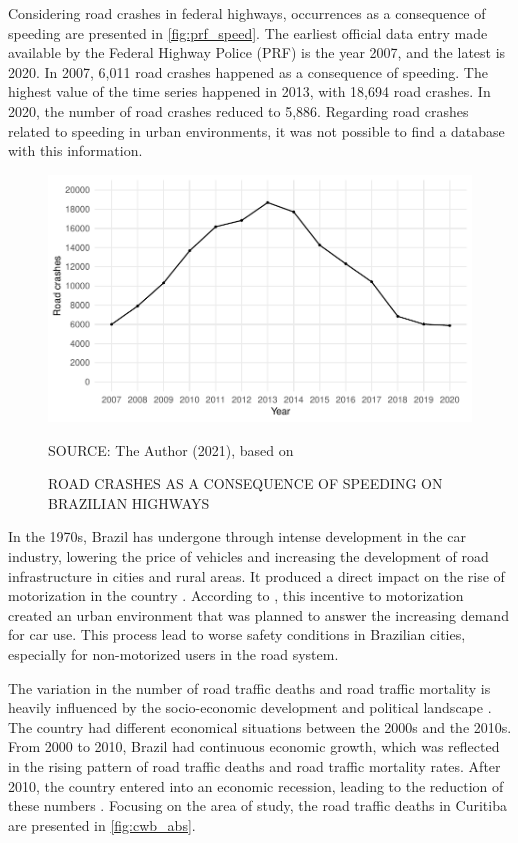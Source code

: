 Considering road crashes in federal highways, occurrences as a consequence of speeding are presented in \autoref{fig:prf_speed}. The earliest official data entry made available by the Federal Highway Police (PRF) is the year 2007, and the latest is 2020. In 2007, 6,011 road crashes happened as a consequence of speeding. The highest value of the time series happened in 2013, with 18,694 road crashes. In 2020, the number of road crashes reduced to 5,886. Regarding road crashes related to speeding in urban environments, it was not possible to find a database with this information. 

\begin{figure}[!htbp]
    \centering\footnotesize
    \captionsetup{font=footnotesize}
    \caption{ROAD CRASHES AS A CONSEQUENCE OF SPEEDING ON BRAZILIAN HIGHWAYS}
    \includegraphics{fig/prf_plot.pdf}
    \label{fig:prf_speed}
    \par SOURCE: The Author (2021), based on \textcite{PRF2021b}
\end{figure}

In the 1970s, Brazil has undergone through intense development in the car industry, lowering the price of vehicles and increasing the development of road infrastructure in cities and rural areas. It produced a direct impact on the rise of motorization in the country \cite{Vasconcellos2013}. According to \textcite{Harvey1982}, this incentive to motorization created an urban environment that was planned to answer the increasing demand for car use. This process lead to worse safety conditions in Brazilian cities, especially for non-motorized users in the road system.   

The variation in the number of road traffic deaths and road traffic mortality is heavily influenced by the socio-economic development and political landscape \cite{Ferraz2012}. The country had different economical situations between the 2000s and the 2010s. From 2000 to 2010, Brazil had continuous economic growth, which was reflected in the rising pattern of road traffic deaths and road traffic mortality rates. After 2010, the country entered into an economic recession, leading to the reduction of these numbers \cite{Bastos2020}. Focusing on the area of study, the road traffic deaths in Curitiba are presented in \autoref{fig:cwb_abs}.   

